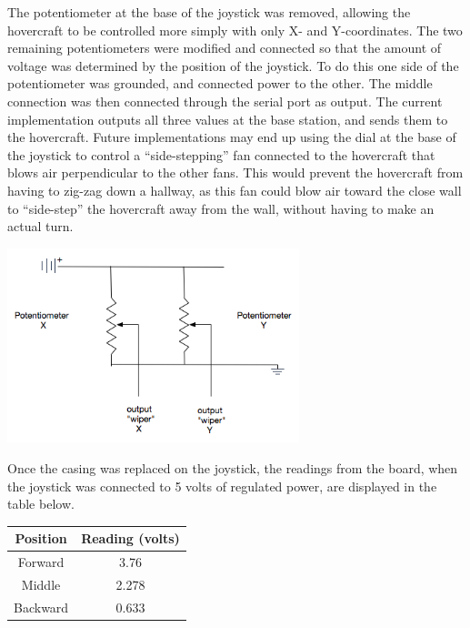 \begin{minipage}{6.5in}
\begin{minipage}{6.5in}
The potentiometer at the base of the joystick was removed, allowing the hovercraft to be controlled more simply with only X- and Y-coordinates. The two remaining potentiometers were modified and connected so that the amount of voltage was determined by the position of the joystick. To do this one side of the potentiometer was grounded, and connected power to the other. The middle connection was then connected through the serial port as output. The current implementation outputs all three values at the base station, and sends them to the hovercraft. Future implementations may end up using the dial at the base of the joystick to control a ``side-stepping'' fan connected to the hovercraft that blows air perpendicular to the other fans. This would prevent the hovercraft from having to zig-zag down a hallway, as this fan could blow air toward the close wall to ``side-step'' the hovercraft away from the wall, without having to make an actual turn.

\begin{minipage}{6.5in}
\begin{center}
  \includegraphics[width=85mm]{imageSources/potentiometerSchematic.png}
\end{center}
\label{potentiometerSchematic}
\end{minipage}

Once the casing was replaced on the joystick, the readings from the board, when the joystick was connected to 5 volts of regulated power, are displayed in the table below.

\begin{minipage}{6.5in}
\begin{center}
\begin{tabular}{ c c }
  Position & Reading (volts) \\
  \hline
  Forward & 3.76 \\
  Middle & 2.278 \\
  Backward & 0.633 \\
\end{tabular}
\end{center}
\label{voltagePotentiometerTable}
\end{minipage}


\end{minipage}
\end{minipage}
